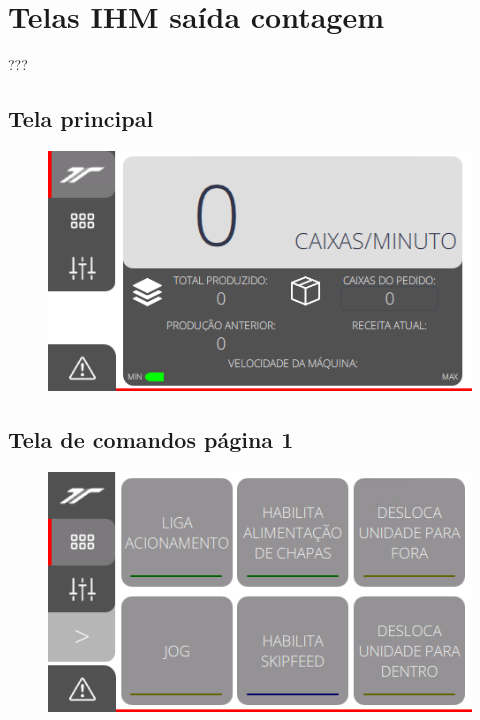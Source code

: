 \thispagestyle{fancy}
\vspace*{40 pt}
\section{Telas IHM saída contagem}
 ???
\subsection{\small{Tela principal}}
\vspace*{\fill}
\begin{figure}[h]
  \centering
  \includegraphics{src/imagesFlexo/12-IHMCNT/e-1.png}
\end{figure}
\vspace*{\fill}

\newpage
\thispagestyle{fancy}
\vspace*{40 pt}
\subsection{\small{Tela de comandos página 1}}
\vspace*{\fill}
\begin{figure}[h]
  \centering
  \includegraphics{src/imagesFlexo/12-IHMCNT/e-2.png}
\end{figure}
\vspace*{\fill}


